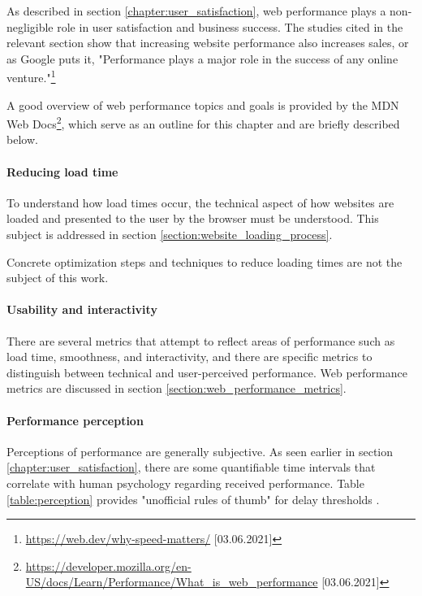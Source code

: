 
As described in section \ref{chapter:user_satisfaction}, web performance plays a non-negligible role in user satisfaction and business success.
The studies cited in the relevant section show that increasing website performance also increases sales, or as Google puts it, "Performance plays a major role in the success of any online venture."\footnote{\url{https://web.dev/why-speed-matters/} [03.06.2021]}

A good overview of web performance topics and goals is provided by the MDN Web Docs\footnote{\url{https://developer.mozilla.org/en-US/docs/Learn/Performance/What_is_web_performance} [03.06.2021]}, which serve as an outline for this chapter and are briefly described below.


\paragraph{Reducing load time} %

To understand how load times occur, the technical aspect of how websites are loaded and presented to the user by the browser must be understood.
This subject is addressed in section \ref{section:website_loading_process}.

Concrete optimization steps and techniques to reduce loading times are not the subject of this work.


\paragraph{Usability and interactivity} %

There are several metrics that attempt to reflect areas of performance such as load time, smoothness, and interactivity, and there are specific metrics to distinguish between technical and user-perceived performance.
Web performance metrics are discussed in section \ref{section:web_performance_metrics}.


\paragraph{Performance perception} %

Perceptions of performance are generally subjective.
As seen earlier in section \ref{chapter:user_satisfaction}, there are some quantifiable time intervals that correlate with human psychology regarding received performance.
Table \ref{table:perception} provides "unofficial rules of thumb" for delay thresholds \cite{2013Grigorik}.

